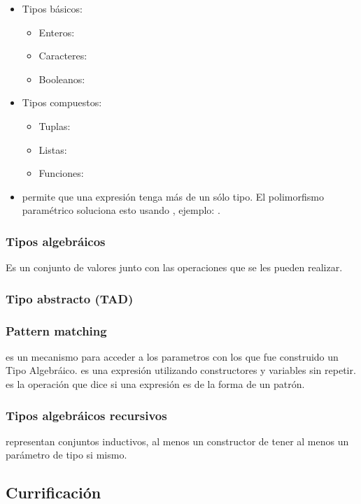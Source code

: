 \begin{itemize}
  \item Tipos básicos:
    \begin{itemize}
      \item Enteros: 
      \item Caracteres: 
      \item Booleanos: 
    \end{itemize}
  \item Tipos compuestos:
    \begin{itemize}
      \item Tuplas: 
      \item Listas: \xtt{[A]}
      \item Funciones: 
    \end{itemize}
  \item {} permite que una expresión tenga más de un sólo tipo. El polimorfismo paramétrico soluciona esto usando , ejemplo: .
\end{itemize}

\subsubsection{Tipos algebráicos} Es un conjunto de valores junto con las operaciones que se les pueden realizar.

\subsubsection{Tipo abstracto (TAD)}

\subsubsection{Pattern matching} es un mecanismo para acceder a los parametros con los que fue construido un Tipo Algebráico.  es una expresión utilizando constructores y variables sin repetir.  es la operación que dice si una expresión es de la forma de un patrón.

\subsubsection{Tipos algebráicos recursivos} representan conjuntos inductivos, al menos un constructor de tener al menos un parámetro de tipo si mismo.

\subsection{Currificación}

